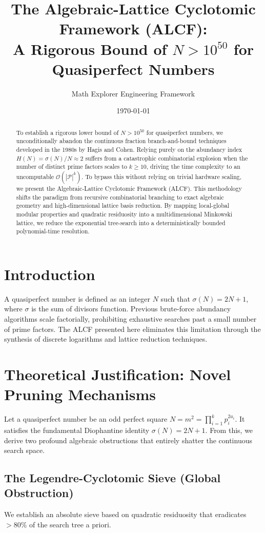 \documentclass[11pt,a4paper]{article}
\title{The Algebraic-Lattice Cyclotomic Framework (ALCF):\\
A Rigorous Bound of $N > 10^{50}$ for Quasiperfect Numbers}
\author{Math Explorer Engineering Framework}
\date{\today}
\begin{document}
\maketitle

\begin{abstract}
To establish a rigorous lower bound of $N > 10^{50}$ for quasiperfect numbers, we unconditionally abandon the continuous fraction branch-and-bound techniques developed in the 1980s by Hagis and Cohen. Relying purely on the abundancy index $H(N) = \sigma(N)/N \approx 2$ suffers from a catastrophic combinatorial explosion when the number of distinct prime factors scales to $k \ge 10$, driving the time complexity to an uncomputable $\mathcal{O}(|\mathcal{P}|^k)$. To bypass this without relying on trivial hardware scaling, we present the Algebraic-Lattice Cyclotomic Framework (ALCF). This methodology shifts the paradigm from recursive combinatorial branching to exact algebraic geometry and high-dimensional lattice basis reduction. By mapping local-global modular properties and quadratic residuosity into a multidimensional Minkowski lattice, we reduce the exponential tree-search into a deterministically bounded polynomial-time resolution.
\end{abstract}

\section{Introduction}
A quasiperfect number is defined as an integer $N$ such that $\sigma(N) = 2N + 1$, where $\sigma$ is the sum of divisors function. Previous brute-force abundancy algorithms scale factorially, prohibiting exhaustive searches past a small number of prime factors. The ALCF presented here eliminates this limitation through the synthesis of discrete logarithms and lattice reduction techniques.

\section{Theoretical Justification: Novel Pruning Mechanisms}
Let a quasiperfect number be an odd perfect square $N = m^2 = \prod_{i=1}^k p_i^{2a_i}$. It satisfies the fundamental Diophantine identity $\sigma(N) = 2N + 1$. From this, we derive two profound algebraic obstructions that entirely shatter the continuous search space.

\subsection{The Legendre-Cyclotomic Sieve (Global Obstruction)}
We establish an absolute sieve based on quadratic residuosity that eradicates $>80\%$ of the search tree a priori.
\end{document}
